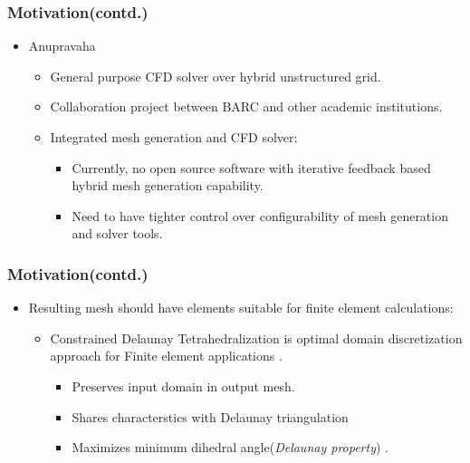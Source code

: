 \documentclass{beamer}
\begin{document}
	\begin{frame}
		\frametitle{Motivation(contd.)}
			\begin{itemize}
				\item Anupravaha
					\begin{itemize}
						\item General purpose CFD solver over hybrid unstructured grid.
						\item Collaboration project between BARC and other academic institutions.
						\item Integrated mesh generation and CFD solver:
							\begin{itemize}
								\item Currently, no open source software  with iterative feedback based hybrid mesh generation capability.
								\item Need to have tighter control over configurability of mesh generation and solver tools.	
							\end{itemize}	
					\end{itemize}		
			\end{itemize}		
	\end{frame}	
	\begin{frame}	
		\frametitle{Motivation(contd.)}	
			\begin{itemize}
				\item Resulting mesh should have elements suitable for finite element calculations:
					\begin{itemize}
						\item Constrained Delaunay Tetrahedralization is optimal domain discretization approach for Finite element applications \cite{schewFiniteElements}.
							\begin{itemize}
								\item Preserves input domain in output mesh.
								\item Shares characterstics with Delaunay triangulation \cite{schewCDTExistence}	
								\item Maximizes minimum dihedral angle(\textit{Delaunay property}) \cite{schewFiniteElements}.
							\end{itemize}
					\end{itemize}		
			\end{itemize}		
	\end{frame}
\end{document}
